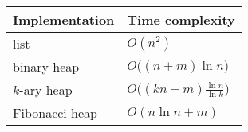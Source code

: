
\begin{tabular}{ll} \hline
Implementation & Time complexity \\\hline
list           & $O(n^2)$ \\[4pt]
binary heap    & $O \big( (n + m) \ln n \big)$ \\[4pt]
$k$-ary heap   & $O \big( (kn + m) \frac{\ln n}{\ln k} \big)$ \\[4pt]
Fibonacci heap & $O(n \ln n + m)$ \\\hline
\end{tabular}
